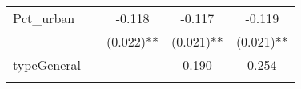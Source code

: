 \documentclass[12pt,twoside]{reedthesis}
\begin{document}
\begin{longtable}[]{@{}lcccc@{}}
  \begin{minipage}[t]{0.26\columnwidth}\raggedright\strut
  Pct\_urban\strut
  \end{minipage} & \begin{minipage}[t]{0.12\columnwidth}\centering\strut
  \strut
  \end{minipage} & \begin{minipage}[t]{0.14\columnwidth}\centering\strut
  -0.118\strut
  \end{minipage} & \begin{minipage}[t]{0.14\columnwidth}\centering\strut
  -0.117\strut
  \end{minipage} & \begin{minipage}[t]{0.14\columnwidth}\centering\strut
  -0.119\strut
  \end{minipage}\tabularnewline
  \begin{minipage}[t]{0.26\columnwidth}\raggedright\strut
  \strut
  \end{minipage} & \begin{minipage}[t]{0.12\columnwidth}\centering\strut
  \strut
  \end{minipage} & \begin{minipage}[t]{0.14\columnwidth}\centering\strut
  (0.022)**\strut
  \end{minipage} & \begin{minipage}[t]{0.14\columnwidth}\centering\strut
  (0.021)**\strut
  \end{minipage} & \begin{minipage}[t]{0.14\columnwidth}\centering\strut
  (0.021)**\strut
  \end{minipage}\tabularnewline
  \begin{minipage}[t]{0.26\columnwidth}\raggedright\strut
  typeGeneral\strut
  \end{minipage} & \begin{minipage}[t]{0.12\columnwidth}\centering\strut
  \strut
  \end{minipage} & \begin{minipage}[t]{0.14\columnwidth}\centering\strut
  \strut
  \end{minipage} & \begin{minipage}[t]{0.14\columnwidth}\centering\strut
  0.190\strut
  \end{minipage} & \begin{minipage}[t]{0.14\columnwidth}\centering\strut
  0.254\strut
  \end{minipage}\tabularnewline
  \begin{minipage}[t]{0.26\columnwidth}\raggedright\strut

\end{minipage}
\end{longtable}
\end{document}

